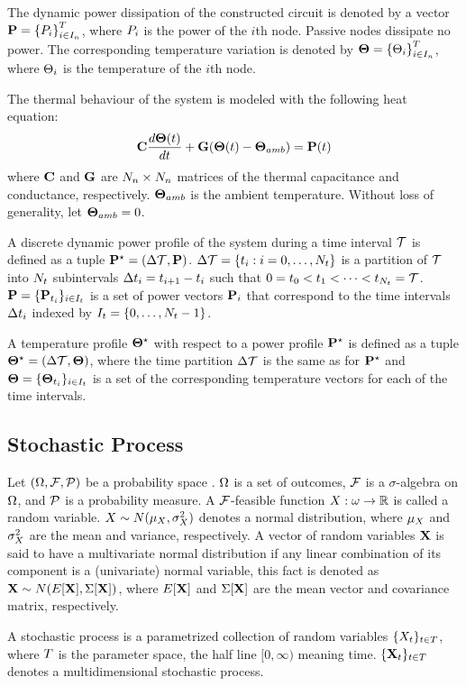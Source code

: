 The dynamic power dissipation of the constructed circuit is denoted by a vector $\mathbf{P} = \left\{P_i\right\}^T_{i \in I_n}$, where $P_i$ is the power of the $i$th node. Passive nodes dissipate no power. The corresponding temperature variation is denoted by $\mathbf{\Theta} = \left\{\Theta_i\right\}^T_{i \in I_n}$, where $\Theta_i$ is the temperature of the $i$th node.

The thermal behaviour of the system is modeled with the following heat equation:
\begin{equation} \equlabel{fourier}
  \mcapacitance \frac{d\vtemperature(\time)}{d\time} + \mconductance (\vtemperature(\time) - \vtemperature_{amb}) = \vpower(\time)
\end{equation}
where $\mathbf{C}$ and $\mathbf{G}$ are $N_n \times N_n$ matrices of the thermal capacitance and conductance, respectively. $\mathbf{\Theta}_{amb}$ is the ambient temperature. Without loss of generality, let $\mathbf{\Theta}_{amb} = 0$.

A discrete dynamic power profile of the system during a time interval $\mathcal{T}$ is defined as a tuple $\mathbf{P}^\star = (\Delta \mathcal{T}, \mathbf{P})$. $\Delta \mathcal{T} = \{ t_i: i = 0, \dots, N_t \}$ is a partition of $\mathcal{T}$ into $N_t$ subintervals $\Delta t_i = t_{i+1} - t_i$ such that $0 = t_0 < t_1 < \dots < t_{N_t} = \mathcal{T}$. $\mathbf{P} = \{ \mathbf{P}_{t_i} \}_{i \in I_t}$ is a set of power vectors $\mathbf{P}_i$ that correspond to the time intervals $\Delta t_i$ indexed by $I_t = \{ 0, \dots, N_t - 1 \}$.

A temperature profile $\mathbf{\Theta}^\star$ with respect to a power profile $\mathbf{P}^\star$ is defined as a tuple $\mathbf{\Theta}^\star = (\Delta \mathcal{T}, \mathbf{\Theta})$, where the time partition $\Delta \mathcal{T}$ is the same as for $\mathbf{P}^\star$ and $\mathbf{\Theta} = \{ \mathbf{\Theta}_{t_i} \}_{i \in I_t}$ is a set of the corresponding temperature vectors for each of the time intervals.

\subsection{Stochastic Process}
Let $(\Omega, \mathcal{F}, \mathcal{P})$ be a probability space \cite{oksendal2003}. $\Omega$ is a set of outcomes, $\mathcal{F}$ is a $\sigma$-algebra on $\Omega$, and $\mathcal{P}$ is a probability measure. A $\mathcal{F}$-feasible function $X: \omega \to \mathbb{R}$ is called a random variable. $X \sim N(\mu_{X}, \sigma_{X}^2)$ denotes a normal distribution, where $\mu_{X}$ and $\sigma_{X}^2$ are the mean and variance, respectively. A vector of random variables $\mathbf{X}$ is said to have a multivariate normal distribution if any linear combination of its component is a (univariate) normal variable, this fact is denoted as $\mathbf{X} \sim N(E[\mathbf{X}], \Sigma[\mathbf{X}])$, where $E[\mathbf{X}]$ and $\Sigma[\mathbf{X}]$ are the mean vector and covariance matrix, respectively.

A stochastic process is a parametrized collection of random variables $\{ X_t \}_{t \in T}$, where $T$ is the parameter space, the half line $[0, \infty)$ meaning time. $\{ \mathbf{X}_t \}_{t \in T}$ denotes a multidimensional stochastic process.
